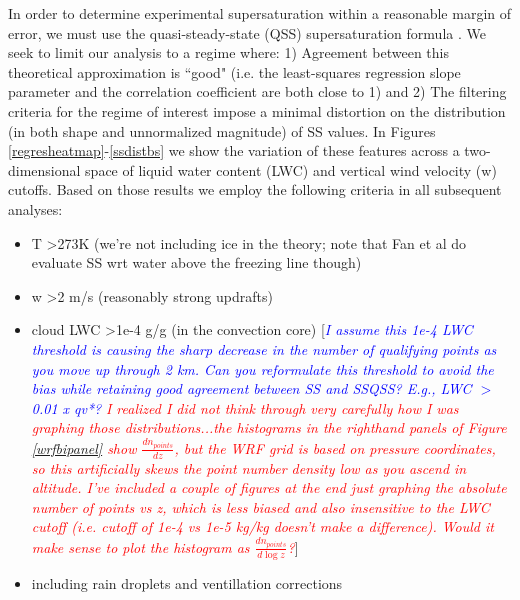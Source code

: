 \documentclass{article}
\newcommand{\drcomm}[1]{\textcolor{blue}{\textit{#1}}}
\newcommand{\klcomm}[1]{\textcolor{red}{\textit{#1}}}
\begin{document}
In order to determine experimental supersaturation within a reasonable margin of error, we must use the quasi-steady-state (QSS) supersaturation formula \cite{Rogers1989}. We seek to limit our analysis to a regime where: 1) Agreement between this theoretical approximation is ``good" (i.e. the least-squares regression slope parameter and the correlation coefficient are both close to 1) and 2) The filtering criteria for the regime of interest impose a minimal distortion on the distribution (in both shape and unnormalized magnitude) of SS values. In Figures \ref{regresheatmap}-\ref{ssdistbs} we show the variation of these features across a two-dimensional space of liquid water content (LWC) and vertical wind velocity (w) cutoffs. Based on those results we employ the following criteria in all subsequent analyses:
\begin{itemize}
	\item T \textgreater  273K (we're not including ice in the theory; note that Fan et al do evaluate SS wrt water above the freezing line though)
	\item w \textgreater  2 m/s (reasonably strong updrafts)
	\item cloud LWC \textgreater  1e-4 g/g (in the convection core) [\drcomm{I assume this 1e-4 LWC threshold is causing the sharp decrease in the number of qualifying points as you move up through 2 km.  Can you reformulate this threshold to avoid the bias while retaining good agreement between SS and SSQSS?  E.g., LWC $>$ 0.01 x qv*?} \klcomm{I realized I did not think through very carefully how I was graphing those distributions...the histograms in the righthand panels of Figure \ref{wrfbipanel} show $\frac{dn_{points}}{dz}$, but the WRF grid is based on pressure coordinates, so this artificially skews the point number density low as you ascend in altitude. I've included a couple of figures at the end just graphing the absolute number of points vs z, which is less biased and also insensitive to the LWC cutoff (i.e. cutoff of 1e-4 vs 1e-5 kg/kg doesn't make a difference). Would it make sense to plot the histogram as $\frac{dn_{points}}{d\log z}$?}]
	\item including rain droplets and ventillation corrections
\end{itemize}
\end{document}
